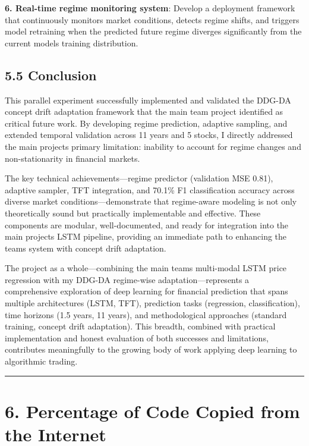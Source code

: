 \documentclass[
]{article}
\begin{document}
\textbf{6. Real-time regime monitoring system}: Develop a deployment
framework that continuously monitors market conditions, detects regime
shifts, and triggers model retraining when the predicted future regime
diverges significantly from the current model\textquotesingle s training
distribution.

\subsection{5.5 Conclusion}\label{55-conclusion}

This parallel experiment successfully implemented and validated the
DDG-DA concept drift adaptation framework that the main team project
identified as critical future work. By developing regime prediction,
adaptive sampling, and extended temporal validation across 11 years and
5 stocks, I directly addressed the main project\textquotesingle s
primary limitation: inability to account for regime changes and
non-stationarity in financial markets.

The key technical achievements---regime predictor (validation MSE 0.81),
adaptive sampler, TFT integration, and 70.1\% F1 classification accuracy
across diverse market conditions---demonstrate that regime-aware
modeling is not only theoretically sound but practically implementable
and effective. These components are modular, well-documented, and ready
for integration into the main project\textquotesingle s LSTM pipeline,
providing an immediate path to enhancing the team\textquotesingle s
system with concept drift adaptation.

The project as a whole---combining the main team\textquotesingle s
multi-modal LSTM price regression with my DDG-DA regime-wise
adaptation---represents a comprehensive exploration of deep learning for
financial prediction that spans multiple architectures (LSTM, TFT),
prediction tasks (regression, classification), time horizons (1.5 years,
11 years), and methodological approaches (standard training, concept
drift adaptation). This breadth, combined with practical implementation
and honest evaluation of both successes and limitations, contributes
meaningfully to the growing body of work applying deep learning to
algorithmic trading.

\begin{center}\rule{0.5\linewidth}{0.5pt}\end{center}

\section{6. Percentage of Code Copied from the
Internet}\label{6-percentage-of-code-copied-from-the-internet}
\end{document}

